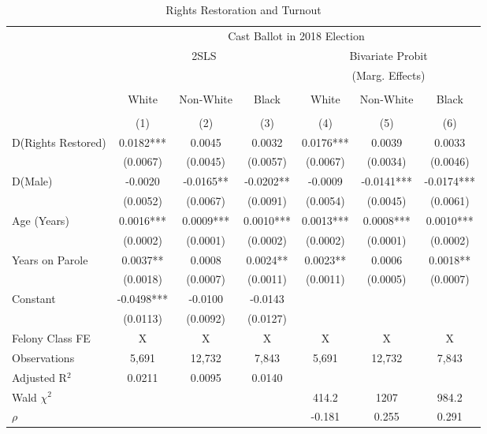 \documentclass[
  12pt,
]{article}
\begin{document}
\begin{singlespace}
\begin{table}[H]
\caption{\label{tab:iv-models-r-chunk}\label{tab:iv-models-r} Rights Restoration and Turnout}
\fontsize{10}{12}\selectfont
\centering

\begin{tabular}{lcccccc}
\\[-1.8ex]\hline
& \multicolumn{6}{c}{Cast Ballot in 2018 Election} \\
& \multicolumn{3}{c}{2SLS} &  \multicolumn{3}{c}{Bivariate Probit}\\
& & & &   \multicolumn{3}{c}{(Marg. Effects)}\\
\cmidrule(l{3pt}r{3pt}){2-4} \cmidrule(l{3pt}r{3pt}){5-7}
\\[-1.8ex] & White & Non-White & Black& White & Non-White & Black\\
\\[-1.8ex] & (1) & (2) & (3) & (4) & (5) & (6)\\
\hline
D(Rights Restored) & 0.0182*** & 0.0045 & 0.0032 & 0.0176*** & 0.0039 & 0.0033 \\
 & (0.0067) & (0.0045) & (0.0057) & (0.0067) & (0.0034) & (0.0046) \\
D(Male) & -0.0020 & -0.0165** & -0.0202** & -0.0009 & -0.0141*** & -0.0174*** \\
 & (0.0052) & (0.0067) & (0.0091) & (0.0054) & (0.0045) & (0.0061) \\
Age (Years) & 0.0016*** & 0.0009*** & 0.0010*** & 0.0013*** & 0.0008*** & 0.0010*** \\
 & (0.0002) & (0.0001) & (0.0002) & (0.0002) & (0.0001) & (0.0002) \\
Years on Parole & 0.0037** & 0.0008 & 0.0024** & 0.0023** & 0.0006 & 0.0018** \\
 & (0.0018) & (0.0007) & (0.0011) & (0.0011) & (0.0005) & (0.0007) \\
Constant & -0.0498*** & -0.0100 & -0.0143 &  &  &  \\
 & (0.0113) & (0.0092) & (0.0127) &  &  &  \\
\hline
Felony Class FE & X & X & X & X & X & X \\
\hline
Observations & 5,691 & 12,732 & 7,843 & 5,691 & 12,732 & 7,843 \\
Adjusted R$^2$ & 0.0211 & 0.0095 & 0.0140 &  &  &  \\
Wald $\chi^2$ &  &  &  & 414.2 & 1207 & 984.2 \\
 $\rho$ &  &  &  & -0.181 & 0.255 & 0.291 \\

\end{tabular}
\end{table}
\end{singlespace}
\end{document}

